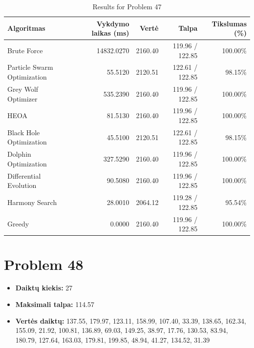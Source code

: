 \documentclass[a4paper,11pt]{article}
\begin{document}
\begin{table}[h!]
\centering
\begin{tabular}{lrrrr}
\toprule
\textbf{Algoritmas} & \textbf{Vykdymo laikas (ms)} & \textbf{Vertė} & \textbf{Talpa} & \textbf{Tikslumas (\%)} \\
\midrule
Brute Force & 14832.0270 & 2160.40 & 119.96 / 122.85 & 100.00\% \\
Particle Swarm Optimization & 55.5120 & 2120.51 & 122.61 / 122.85 & 98.15\% \\
Grey Wolf Optimizer & 535.2390 & 2160.40 & 119.96 / 122.85 & 100.00\% \\
HEOA & 81.5130 & 2160.40 & 119.96 / 122.85 & 100.00\% \\
Black Hole Optimization & 45.5100 & 2120.51 & 122.61 / 122.85 & 98.15\% \\
Dolphin Optimization & 327.5290 & 2160.40 & 119.96 / 122.85 & 100.00\% \\
Differential Evolution & 90.5080 & 2160.40 & 119.96 / 122.85 & 100.00\% \\
Harmony Search & 28.0010 & 2064.12 & 119.28 / 122.85 & 95.54\% \\
Greedy & 0.0000 & 2160.40 & 119.96 / 122.85 & 100.00\% \\
\bottomrule
\end{tabular}
\caption{Results for Problem 47}
\end{table}
\clearpage

\section*{Problem 48}
\begin{itemize}
    \item \textbf{Daiktų kiekis:} 27
    \item \textbf{Maksimali talpa:} 114.57
    \item \textbf{Vertės daiktų:} 137.55, 179.97, 123.11, 158.99, 107.40, 33.39, 138.65, 162.34, 155.09, 21.92, 100.81, 136.89, 69.03, 149.25, 38.97, 17.76, 130.53, 83.94, 180.79, 127.64, 163.03, 179.81, 199.85, 48.94, 41.27, 134.52, 31.39
\end{itemize}
\end{document}
